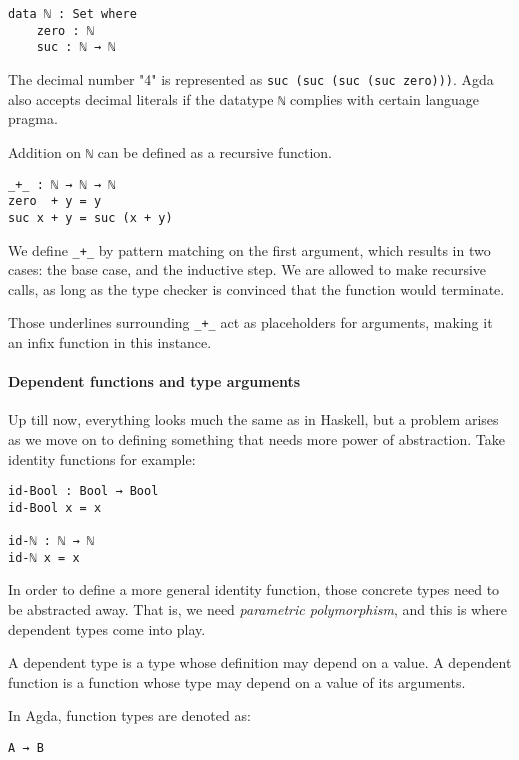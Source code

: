 \documentclass[../thesis.tex]{subfiles}
\begin{document}
\begin{lstlisting}
data ℕ : Set where
    zero : ℕ
    suc : ℕ → ℕ
\end{lstlisting}

The decimal number "4" is represented as {\lstinline|suc (suc (suc (suc zero)))|}.
Agda also accepts decimal literals if the datatype {\lstinline|ℕ|} complies with
certain language pragma.

Addition on {\lstinline|ℕ|} can be defined as a recursive function.

\begin{lstlisting}
_+_ : ℕ → ℕ → ℕ
zero  + y = y
suc x + y = suc (x + y)
\end{lstlisting}

We define {\lstinline|_+_|} by pattern matching on the first argument, which results
in two cases: the base case, and the inductive step. We are allowed to make
recursive calls, as long as the type checker is convinced that the function
would terminate.

Those underlines surrounding {\lstinline|_+_|} act as placeholders for arguments, making
it an infix function in this instance.

\paragraph{Dependent functions and type arguments}

Up till now, everything looks much the same as in Haskell, but a problem arises as
we move on to defining something that needs more power of abstraction. Take identity
functions for example:

\begin{lstlisting}
id-Bool : Bool → Bool
id-Bool x = x

id-ℕ : ℕ → ℕ
id-ℕ x = x
\end{lstlisting}

In order to define a more general identity function, those concrete types need
to be abstracted away. That is, we need \textit{parametric polymorphism}, and this is
where dependent types come into play.

A dependent type is a type whose definition may depend on a value. A dependent
function is a function whose type may depend on a value of its arguments.

In Agda, function types are denoted as:

\begin{lstlisting}
A → B
\end{lstlisting}
\end{document}
